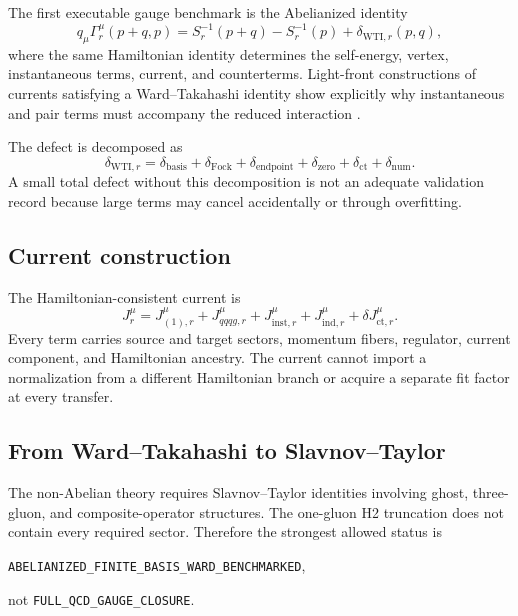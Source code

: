 \documentclass[11pt]{article}
\newcommand{\ind}{\mathrm{ind}}
\newcommand{\ct}{\mathrm{ct}}
\newcommand{\num}{\mathrm{num}}
\newcommand{\WTI}{\mathrm{WTI}}
\begin{document}
The first executable gauge benchmark is the Abelianized identity
\begin{equation}
 q_\mu\Gamma_r^\mu(p+q,p)
 =
 S_r^{-1}(p+q)-S_r^{-1}(p)
 +\delta_{\WTI,r}(p,q),
 \label{eq:wti}
\end{equation}
where the same Hamiltonian identity determines the self-energy, vertex,
instantaneous terms, current, and counterterms.  Light-front constructions of
currents satisfying a Ward--Takahashi identity show explicitly why
instantaneous and pair terms must accompany the reduced interaction
\cite{Marinho2008}.

The defect is decomposed as
\begin{equation}
 \delta_{\WTI,r}
 =
 \delta_{\mathrm{basis}}
 +\delta_{\mathrm{Fock}}
 +\delta_{\mathrm{endpoint}}
 +\delta_{\mathrm{zero}}
 +\delta_{\mathrm{ct}}
 +\delta_{\num}.
 \label{eq:wti-decomp}
\end{equation}
A small total defect without this decomposition is not an adequate validation
record because large terms may cancel accidentally or through overfitting.

\subsection{Current construction}

The Hamiltonian-consistent current is
\begin{equation}
 J_r^\mu
 =
 J_{(1),r}^\mu
 +J_{qqqg,r}^\mu
 +J_{\mathrm{inst},r}^\mu
 +J_{\ind,r}^\mu
 +\delta J_{\ct,r}^\mu.
 \label{eq:h2-current}
\end{equation}
Every term carries source and target sectors, momentum fibers, regulator,
current component, and Hamiltonian ancestry.  The current cannot import a
normalization from a different Hamiltonian branch or acquire a separate fit
factor at every transfer.

\subsection{From Ward--Takahashi to Slavnov--Taylor}

The non-Abelian theory requires Slavnov--Taylor identities involving ghost,
three-gluon, and composite-operator structures.  The one-gluon H2 truncation
does not contain every required sector.  Therefore the strongest allowed
status is
\begin{center}
\texttt{ABELIANIZED\_FINITE\_BASIS\_WARD\_BENCHMARKED},
\end{center}
not \texttt{FULL\_QCD\_GAUGE\_CLOSURE}.
\end{document}
